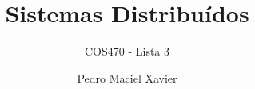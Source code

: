 \documentclass[brazil, answer]{homework}
\title{Sistemas Distribuídos}
\subtitle{COS470 - Lista 3}
\author{Pedro Maciel Xavier}
\begin{document}
\cmaketitle

    
\end{document}
